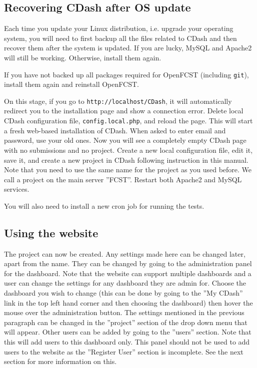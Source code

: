 \subsection{Recovering CDash after OS update}

Each time you update your Linux distribution, i.e. upgrade your operating system, you will need to first backup all the files related to CDash and then recover them after the system is updated. If you are lucky, MySQL and Apache2 will still be working. Otherwise, install them again.

If you have not backed up all packages required for OpenFCST (including \verb!git!), install them again and reinstall OpenFCST.

On this stage, if you go to \verb!http://localhost/CDash!, it will automatically redirect you to the installation page and show a connection error. Delete local CDash configuration file, \verb!config.local.php!, and reload the page. This will start a fresh web-based installation of CDash. When asked to enter email and password, use your old ones. Now you will see a completely empty CDash page with no submissions and no project. Create a new local configuration file, edit it, save it, and create a new project in CDash following instruction in this manual. Note that you need to use the same name for the project as you used before. We call a project on the main server ''FCST''. Restart both Apache2 and MySQL services.

You will also need to install a new cron job for running the tests.

\subsection{Using the website}

The project can now be created. Any settings made here can be changed later, apart from the name. They can be changed by going to the administration panel for the dashboard. Note that the website can support multiple dashboards and a user can change the settings for any dashboard they are admin for. Choose the dashboard you wish to change (this can be done by going to the ''My CDash'' link in the top left hand corner and then choosing the dashboard) then hover the mouse over the administration button. The settings mentioned in the previous paragraph can be changed in the ''project'' section of the drop down menu that will appear. Other users can be added by going to the ''users'' section. Note that this will add users to this dashboard only. This panel should not be used to add users to the website as the ''Register User'' section is incomplete. See the next section for more information on this. 

